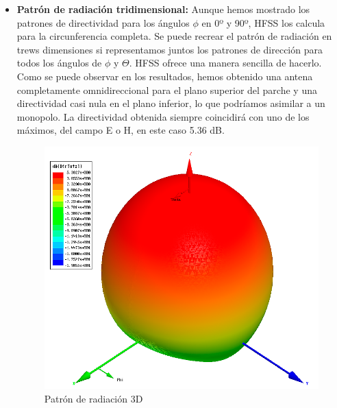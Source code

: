 \begin{itemize}
\item \textbf{Patrón de radiación tridimensional: }Aunque hemos mostrado los patrones de directividad para los ángulos $\phi $ en 0º y 90º, HFSS los calcula para la circunferencia completa. Se puede recrear el patrón de radiación en trews dimensiones si representamos juntos los patrones de dirección para todos los ángulos de $\phi$ y $\Theta$. HFSS ofrece una manera sencilla de hacerlo. Como se puede observar en los resultados, hemos obtenido una antena completamente omnidireccional para el plano superior del parche y una directividad casi nula en el plano inferior, lo que podríamos asimilar a un monopolo. La directividad obtenida siempre coincidirá con uno de los máximos, del campo E o H, en este caso 5.36 dB.
	\begin{figure}[H]
    \centering
        \includegraphics[width=\textwidth]{archivos/analisis/1x11/6}
        \caption{Patrón de radiación 3D}
        \label{fig:rad3d}
	\end{figure}
	

\end{itemize}

